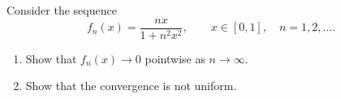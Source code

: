 \begingroup
\renewcommand{\labelenumi}{(\alph{enumi})}
\begin{exercise}
  \label{ex:hw05:pointwise-not-uniform}
  Consider the sequence
  \[
    f_n(x)=\frac{nx}{1+n^2x^2},\qquad
    x\in[0,1],\quad n=1,2,\ldots.
  \]
  \begin{enumerate}
    \item Show that $f_n(x)\to0$ pointwise as $n\to\infty$.
    \item Show that the convergence is not uniform.
  \end{enumerate}
\end{exercise}
\endgroup
